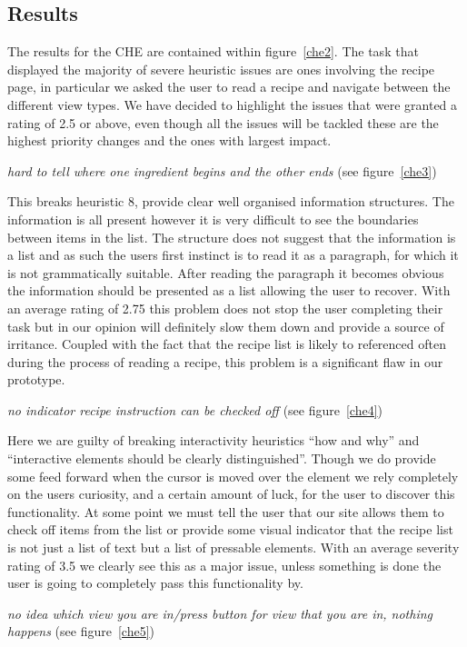 \subsection{Results}
The results for the CHE are contained within figure~\ref{che2}. The task that displayed the majority of severe heuristic issues are ones involving the recipe page, in particular we asked the user to read a recipe and navigate between the different view types. We have decided to highlight the issues that were granted a rating of 2.5 or above, even though all the issues will be tackled these are the highest priority changes and the ones with largest impact.
\begin{center}
  \emph{hard to tell where one ingredient begins and the other ends} (see figure~\ref{che3})
\end{center}
This breaks heuristic 8, provide clear well organised information structures. The information is all present however it is very difficult to see the boundaries between items in the list. The structure does not suggest that the information is a list and as such the users first instinct is to read it as a paragraph, for which it is not grammatically suitable. After reading the paragraph it becomes obvious the information should be presented as a list allowing the user to recover. With an average rating of 2.75 this problem does not stop the user completing their task but in our opinion will definitely slow them down and provide a source of irritance. Coupled with the fact that the recipe list is likely to referenced often during the process of reading a recipe, this problem is a significant flaw in our prototype.
\begin{center}
  \emph{no indicator recipe instruction can be checked off} (see figure~\ref{che4})
\end{center}
Here we are guilty of breaking interactivity heuristics “how and why” and “interactive elements should be clearly distinguished”. Though we do provide some feed forward when the cursor is moved over the element we rely completely on the users curiosity, and a certain amount of luck, for the user to discover this functionality. At some point we must tell the user that our site allows them to check off items from the list or provide some visual indicator that the recipe list is not just a list of text but a list of pressable elements. With an average severity rating of 3.5 we clearly see this as a major issue, unless something is done the user is going to completely pass this functionality by.
\begin{center}
  \emph{no idea which view you are in/press button for view that you are in, nothing happens} (see figure~\ref{che5})
\end{center}
